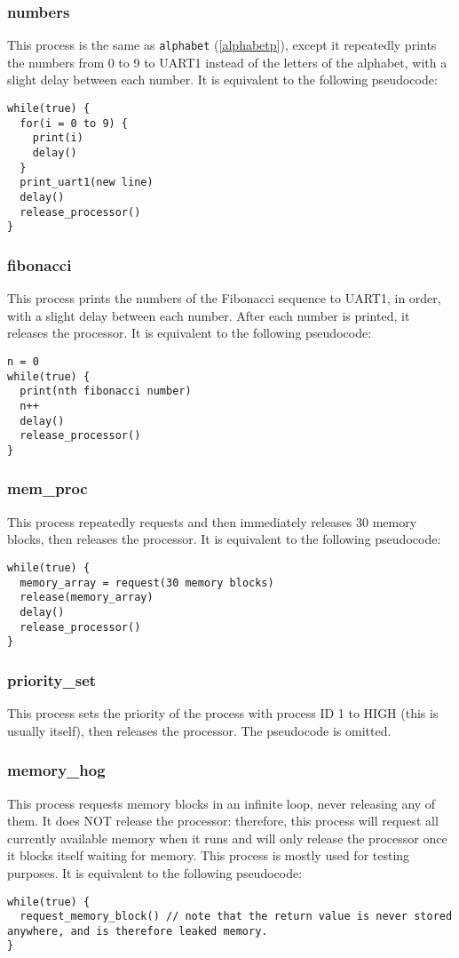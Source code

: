 \documentclass[12pt]{article}
\begin{document}
\subsubsection{numbers}\label{numbersp}
This process is the same as \verb|alphabet| (\ref{alphabetp}), except it repeatedly prints the numbers from 0 to 9 to UART1 instead of the letters of the alphabet, with a slight delay between each number. It is equivalent to the following pseudocode:
\begin{lstlisting}
while(true) {
  for(i = 0 to 9) {
    print(i)
    delay()
  }
  print_uart1(new line)
  delay()
  release_processor()
}
\end{lstlisting}

\subsubsection{fibonacci}\label{fibonaccip}
This process prints the numbers of the Fibonacci sequence to UART1, in order, with a slight delay between each number. After each number is printed, it releases the processor. It is equivalent to the following pseudocode:

\begin{lstlisting}
n = 0
while(true) {
  print(nth fibonacci number)
  n++
  delay()
  release_processor()
}
\end{lstlisting}

\subsubsection{mem\_proc} \label{memprocp}
This process repeatedly requests and then immediately releases 30 memory blocks, then releases the processor. It is equivalent to the following pseudocode:
\begin{lstlisting}
while(true) {
  memory_array = request(30 memory blocks)
  release(memory_array)
  delay()
  release_processor()
}
\end{lstlisting}

\subsubsection{priority\_set}\label{prioritysetp}
This process sets the priority of the process with process ID 1 to HIGH (this is usually itself), then releases the processor. The pseudocode is omitted.

\subsubsection{memory\_hog}\label{memoryhogp}
This process requests memory blocks in an infinite loop, never releasing any of them. It does NOT release the processor: therefore, this process will request all currently available memory when it runs and will only release the processor once it blocks itself waiting for memory. This process is mostly used for testing purposes. It is equivalent to the following pseudocode:
\begin{lstlisting}[breaklines=true]
while(true) {
  request_memory_block() // note that the return value is never stored anywhere, and is therefore leaked memory.
}
\end{lstlisting}
\end{document}
